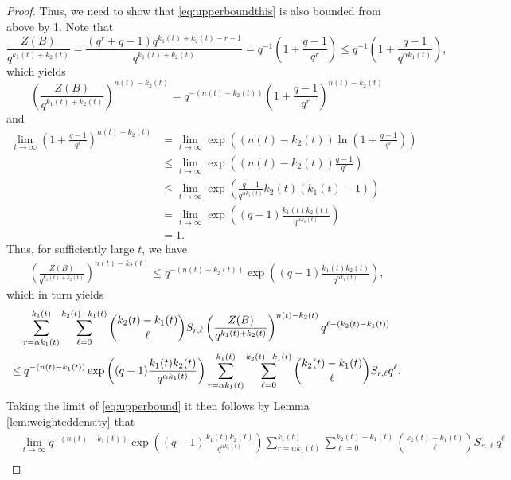 \documentclass[a4paper,11pt,reqno]{article}
\theoremstyle{plain} \numberwithin{equation}{section}
\theoremstyle{definition}
\begin{document}
\begin{proof}
Thus, we need to show that \eqref{eq:upperboundthis} is also bounded from above by 1. Note that
\[
    \frac{Z(B)}{q^{k_1(t)+k_2(t)}} = \frac{(q^{r}+q-1)q^{k_1(t)+k_2(t)-r-1}}{q^{k_1(t)+k_2(t)}} = q^{-1}\left(1+\frac{q-1}{q^r}\right)\leq q^{-1}\left(1+\frac{q-1}{q^{\alpha k_1(t)}} \right),
\]
which yields
\[
    \left(\frac{Z(B)}{q^{k_1(t)+k_2(t)}}\right)^{n(t)-k_2(t)} = q^{-(n(t)-k_2(t))}\left(1+\frac{q-1}{q^r}\right)^{n(t)-k_2(t)}
\]
and
\begin{align*}
    \lim_{t\rightarrow \infty}  \left(1+\frac{q-1}{q^r}\right)^{n(t)-k_2(t)} &= \lim_{t\rightarrow \infty} \exp\left((n(t)-k_2(t))\ln \left(1+\frac{q-1}{q^r}\right) \right) \\
    &\leq \lim_{t\rightarrow \infty} \exp\left((n(t)-k_2(t))\frac{q-1}{q^r}\right) \\
    &\leq  \lim_{t\rightarrow \infty}\exp\left(\frac{q-1}{q^{\alpha k_1(t)}}k_2(t)(k_1(t)-1) \right) \\
    &=  \lim_{t\rightarrow \infty}\exp\left((q-1)\frac{k_1(t)k_2(t)}{q^{\alpha k_1(t)}} \right)\\
    &= 1.
\end{align*}
Thus, for sufficiently large $t$, we have 
\begin{align*}
    \left(\frac{Z(B)}{q^{k_1(t)+k_2(t)}}\right)^{n(t)-k_2(t)} \leq q^{-(n(t)-k_2(t))}\exp\left((q-1)\frac{k_1(t)k_2(t)}{q^{\alpha k_1(t)}} \right),
\end{align*}
which in turn yields
\begin{align}
    &\sum_{r=\alpha k_1(t)}^{k_1(t)}\sum_{\ell = 0}^{k_2(t)-k_1(t)} \binom{k_2(t)-k_1(t)}{\ell} S_{r,\ell} \left(  \frac{Z(B)}{q^{k_1(t)+k_2(t)}}\right)^{n(t)-k_2(t)} q^{\ell - (k_2(t)-k_1(t))} \notag\\
    \leq& \: q^{-(n(t)-k_1(t))}\exp\left((q-1)\frac{k_1(t)k_2(t)}{q^{\alpha k_1(t)}} \right)\sum_{r=\alpha k_1(t)}^{k_1(t)}\sum_{\ell = 0}^{k_2(t)-k_1(t)} \binom{k_2(t)-k_1(t)}{\ell} S_{r,\ell}q^{\ell}. \label{eq:upperbound}
\end{align}
Taking the limit of \eqref{eq:upperbound} it then follows by Lemma \ref{lem:weighteddensity} that
\begin{align*}
&\lim_{t\rightarrow \infty } q^{-(n(t)-k_1(t))}\exp\left((q-1)\frac{k_1(t)k_2(t)}{q^{\alpha k_1(t)}} \right)\sum_{r=\alpha k_1(t)}^{k_1(t)}\sum_{\ell = 0}^{k_2(t)-k_1(t)} \binom{k_2(t)-k_1(t)}{\ell} S_{r,\ell}q^{\ell} \\ 

\end{align*}
\end{proof}
\end{document}
